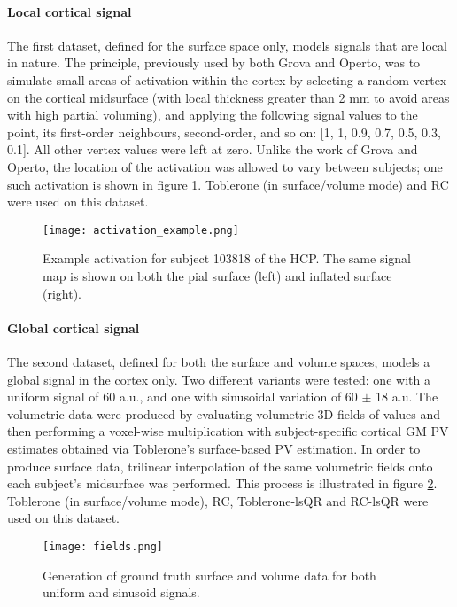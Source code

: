 \documentclass[review]{elsarticle}
\begin{document}
\paragraph{Local cortical signal}
The first dataset, defined for the surface space only, models signals that are local in nature. The principle, previously used by both Grova and Operto, was to simulate small areas of activation within the cortex by selecting a random vertex on the cortical midsurface (with local thickness greater than 2 mm to avoid areas with high partial voluming), and applying the following signal values to the point, its first-order neighbours, second-order, and so on: [1, 1, 0.9, 0.7, 0.5, 0.3, 0.1]. All other vertex values were left at zero. Unlike the work of Grova and Operto, the location of the activation was allowed to vary between subjects; one such activation is shown in figure \ref{activation_example}. Toblerone (in surface/volume mode) and RC were used on this dataset. 

\begin{figure}[H]
\centering
\texttt{[image: activation\_example.png]}
\caption{Example activation for subject 103818 of the HCP. The same signal map is shown on both the pial surface (left) and inflated surface (right).}
\label{activation_example}
\end{figure}

\paragraph{Global cortical signal}
The second dataset, defined for both the surface and volume spaces, models a global signal in the cortex only. Two different variants were tested: one with a uniform signal of 60 a.u., and one with sinusoidal variation of 60 $\pm$ 18 a.u. The volumetric data were produced by evaluating volumetric 3D fields of values and then performing a voxel-wise multiplication with subject-specific cortical GM PV estimates obtained via Toblerone's surface-based PV estimation. In order to produce surface data, trilinear interpolation of the same volumetric fields onto each subject's midsurface was performed. This process is illustrated in figure \ref{fields}. Toblerone (in surface/volume mode), RC, Toblerone-lsQR and RC-lsQR were used on this dataset. 

\begin{figure}[H]
\centering
\texttt{[image: fields.png]}
\caption{Generation of ground truth surface and volume data for both uniform and sinusoid signals.}
\label{fields}
\end{figure}
\end{document}
